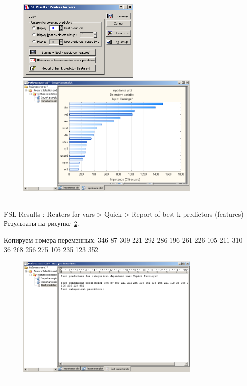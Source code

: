 \begin{figure}[!h]
  \centering

  \begin{minipage}{0.29\textwidth}
    \centering

    \includegraphics[height=4cm]
    {inc/var5/21.PNG}

    \caption{\_}

    \label{fig:var5_21}
  \end{minipage}
  \begin{minipage}{0.69\textwidth}
    \centering

    \includegraphics[height=6cm]
    {inc/var5/22.PNG}

    \caption{\_}

    \label{fig:var5_22}
  \end{minipage}
\end{figure}

\newpage

FSL Results : Reuters for vars > Quick > Report of best k predictors (features) \\

Результаты на рисунке~\ref{fig:var5_23}.

Копируем номера переменных:
346 87 309 221 292 286 196 261 226 105 211 310 36 268 256 275 106 235 123 352

\begin{figure}[!h]
  \centering

  \includegraphics[height=6cm]
  {inc/var5/23.PNG}

  \caption{\_}

  \label{fig:var5_23}
\end{figure}

